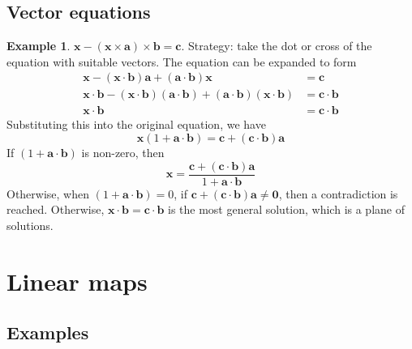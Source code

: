 \documentclass[a4paper]{article}
\theoremstyle{definition}
\newtheorem*{eg}{Example}
\newcommand{\mb}[1]{\mathbf{#1}}
\let\stdsection\section
\renewcommand\section{\newpage\stdsection}
\begin{document}
\subsection{Vector equations}
\begin{eg}
  $\mb{x - (x\times a)\times b = c}$. Strategy: take the dot or cross of the equation with suitable vectors. The equation can be expanded to form
  \begin{align*}
    \mb{x - (x\cdot b)a + (a\cdot b)x} &= \mb{c}\\
    \mb{x\cdot b - (x\cdot b)(a\cdot b) + (a\cdot b)(x\cdot b)} &= \mb{c\cdot b}\\
    \mb{x\cdot b} &= \mb{c\cdot b}
  \end{align*}
  Substituting this into the original equation, we have
  \[
  \mb{x}(1 + \mb{a\cdot b}) = \mb{c + (c\cdot b)a}
  \]
  If $(1 + \mb{a \cdot b})$ is non-zero, then
  \[
  \mb{x} = \frac{\mb{c + (c\cdot b)a}}{1 + \mb{a\cdot b}}
  \]
  Otherwise, when $(1 + \mb{a\cdot b}) = 0$, if $\mb{c + (c\cdot b)a \not= 0}$, then a contradiction is reached. Otherwise, $\mb{x\cdot b = c\cdot b}$ is the most general solution, which is a plane of solutions.
\end{eg}

\section{Linear maps}
\subsection{Examples}
\end{document}
